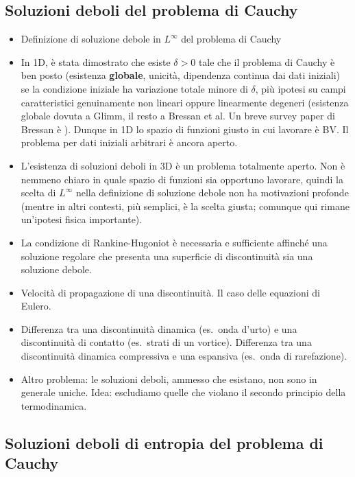 \subsection*{Soluzioni deboli del problema di Cauchy}

\begin{itemize}
\item Definizione di soluzione debole in $L^\infty$ del problema di Cauchy
\item In 1D, è stata dimostrato che esiste $\delta > 0$ tale che
	il problema di Cauchy è ben posto
	(esistenza \textbf{globale}, unicità, dipendenza continua dai dati iniziali)
	se la condizione iniziale ha variazione totale minore di $\delta$,
	più ipotesi su campi caratteristici genuinamente non lineari
	oppure linearmente degeneri
	(esistenza globale dovuta a Glimm, il resto a Bressan et al.
	Un breve survey paper di Bressan è \cite{bressan}).
	Dunque in 1D lo spazio di funzioni giusto in cui lavorare è BV.
	Il problema per dati iniziali arbitrari è ancora aperto.
\item L'esistenza di soluzioni deboli in 3D è un problema totalmente aperto.
	Non è nemmeno chiaro in quale spazio di funzioni sia opportuno lavorare,
	quindi la scelta di $L^\infty$ nella definizione di soluzione
	debole non ha motivazioni profonde (mentre in altri contesti, più semplici,
	è la scelta giusta; comunque qui rimane un'ipotesi fisica importante).
\item La condizione di Rankine-Hugoniot è necessaria e sufficiente affinché
	una soluzione regolare che presenta una superficie di discontinuità
	sia una soluzione debole.
\item Velocità di propagazione di una discontinuità.
	Il caso delle equazioni di Eulero.
\item Differenza tra una discontinuità dinamica (es.\ onda d'urto)
	e una discontinuità di contatto (es.\ strati di un vortice).
	Differenza tra una discontinuità dinamica compressiva e una espansiva
	(es.\ onda di rarefazione).
\item Altro problema: le soluzioni deboli, ammesso che esistano,
	non sono in generale uniche.
	Idea: escludiamo quelle che violano il secondo principio della termodinamica.
\end{itemize}

\subsection*{Soluzioni deboli di entropia del problema di Cauchy}

